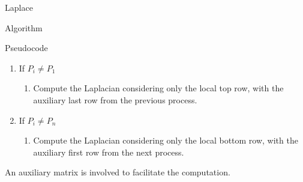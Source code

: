 \begin{chapter}{Laplace}
\begin{section}{Algorithm}
\begin{subsection}{Pseudocode}
\begin{enumerate}
                \item If $P_i \neq P_1$
                \begin{enumerate}
                    \item Compute the Laplacian considering only the local top row, with the auxiliary last row from the previous process.
                \end{enumerate}
                \item If $P_i \neq P_n$
                \begin{enumerate}
                    \item Compute the Laplacian considering only the local bottom row, with the auxiliary first row from the next process.
                \end{enumerate}
            \end{enumerate}
            An auxiliary matrix is involved to facilitate the computation.
            
        \end{subsection}
    \end{section}
\end{chapter}